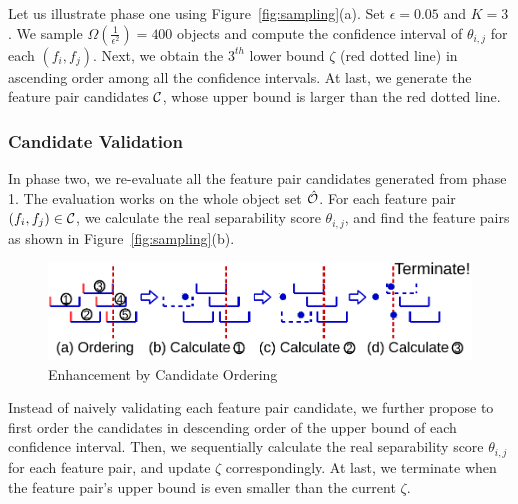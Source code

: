 \begin{example}
Let us illustrate phase one using Figure~\ref{fig:sampling}(a). Set $\epsilon = 0.05$ and $K=3$. We sample $\Omega(\frac{1}{\epsilon^2})=400$ objects and compute the confidence interval of $\theta_{i,j}$ for each $(f_i,f_j)$. Next, we obtain the $3^{th}$ lower bound $\zeta$ (red dotted line) in ascending order among all the confidence intervals. At last, we generate the feature pair candidates $\cc$, whose upper bound is larger than the red dotted line.
\end{example}

\subsubsection{Candidate Validation}\label{sssec:validate}
In phase two, we re-evaluate all the feature pair candidates generated from phase 1. The evaluation works on the whole object set $\hat{\oo}$. For each feature pair $(f_i,f_j)\in \cc$, we calculate the real separability score $\theta_{i,j}$, and find the \topk feature pairs as shown in Figure~\ref{fig:sampling}(b). 

\begin{figure}[h]
  \centering
  \includegraphics[width=\linewidth]{fig/candidate_ordering.pdf}
  \vspace{-6mm}
\caption{Enhancement by Candidate Ordering}
\label{fig:candidate_ordering}
\end{figure} 


  Instead of naively validating each feature pair candidate, we further propose to first order the candidates in descending order of the upper bound of each confidence interval. Then, we sequentially calculate the real separability score $\theta_{i,j}$ for each feature pair, and update $\zeta$ correspondingly. At last, we terminate when the feature pair's upper bound is even smaller than the current $\zeta$.


